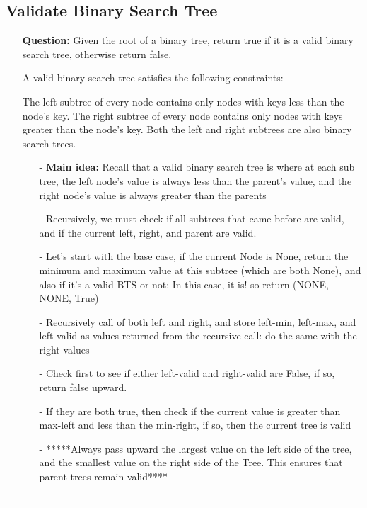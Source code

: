 \documentclass[12pt]{article}
\begin{document}
\subsection{Validate Binary Search Tree}
\begin{enumerate}
  \item[] \textbf{Question:} Given the root of a binary tree, return true if it is a valid binary search tree, otherwise return false.

A valid binary search tree satisfies the following constraints:

The left subtree of every node contains only nodes with keys less than the node's key.
The right subtree of every node contains only nodes with keys greater than the node's key.
Both the left and right subtrees are also binary search trees.


    \begin{enumerate}
      \item[-] \textbf{Main idea:} Recall that a valid binary search tree is where at each sub tree, the left node's value is always less than the parent's value, and the right node's value is always greater than the parents
      \item[-] Recursively, we must check if all subtrees that came before are valid, and if the current left, right, and parent are valid.
      \item[-] Let's start with the base case, if the current Node is None, return the minimum and maximum value at this subtree (which are both None), and also if it's a valid BTS or not: In this case, it is! so return (NONE, NONE, True)
      \item[-] Recursively call of both left and right, and store left-min, left-max, and left-valid as values returned from the recursive call: do the same with the right values
      \item[-] Check first to see if either left-valid and right-valid are False, if so, return false upward.
      \item[-] If they are both true, then check if the current value is greater than max-left and less than the min-right, if so, then the current tree is valid
      \item[-] *****Always pass upward the largest value on the left side of the tree, and the smallest value on the right side of the Tree. This ensures that parent trees remain valid****
      \item[-]
    \end{enumerate}
\end{enumerate}
\end{document}
